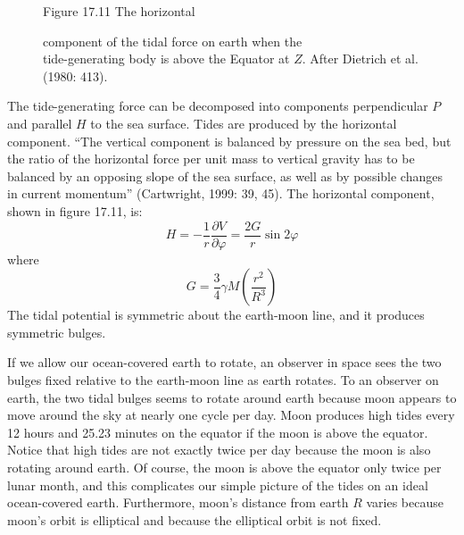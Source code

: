 \begin{figure}[t!]
\footnotesize
\centering
Figure 17.11 The horizontal \rule{0mm}{4ex}component of the tidal
force on earth when the\\tide-generating body is above the Equator at
$Z$. After Dietrich et al. (1980: 413).

\label{fig:horiztideforce}
\vspace{-3ex}
\end{figure}

The tide-generating force can be decomposed into components
perpendicular $P$ and parallel $H$ to the sea surface. Tides are
produced by the horizontal component. ``The vertical component is
balanced by pressure on the sea bed, but the ratio of the horizontal
force per unit mass to vertical gravity has to be balanced by an
opposing slope of the sea surface, as well as by possible changes in
current momentum'' (Cartwright, 1999: 39, 45). The horizontal
component, shown in figure 17.11, is:
\begin{equation}
H = - \frac{1}{r} \frac{\partial V}{\partial\varphi} = \frac{2 G}{r} \sin
2\varphi
\end{equation}
where
\begin{equation}
G = \frac{3}{4} \gamma M \left( \frac{r^{2}}{R^{3}} \right)
\end{equation}
The tidal potential is symmetric about the earth-moon
line, and it produces symmetric bulges.

If we allow our ocean-covered earth to rotate, an observer in space
sees the two bulges fixed relative to the earth-moon line as earth
rotates. To an observer on earth, the two tidal bulges seems to rotate
around earth because moon appears to move around the sky at nearly one
cycle per day. Moon produces high tides every 12 hours and 25.23
minutes on the equator if the moon is above the equator. Notice that
high tides are not exactly twice per day because the moon is also
rotating around earth. Of course, the moon is above the equator only
twice per lunar month, and this complicates our simple picture of the
tides on an ideal ocean-covered earth.  Furthermore, moon's distance
from earth $R$ varies because moon's orbit is elliptical and because
the elliptical orbit is not fixed.

